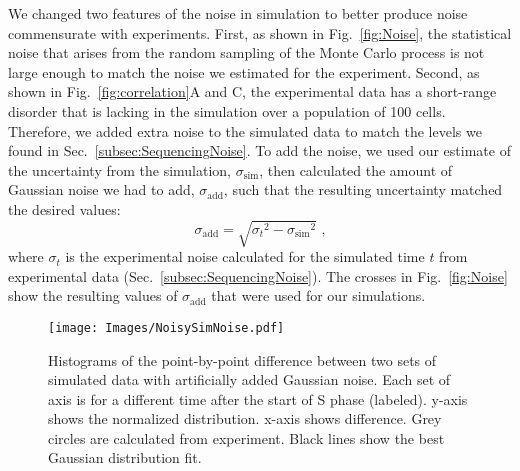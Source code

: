 		We changed two features of the noise in simulation to better produce noise commensurate with experiments.
		First, as shown in Fig.~\ref{fig:Noise}, the statistical noise that arises from the random sampling of the Monte Carlo process is not large enough to match the noise we estimated for the experiment.
		Second, as shown in Fig.~\ref{fig:correlation}A and C, the experimental data has a short-range disorder that is lacking in the simulation over a population of 100 cells.
		Therefore, we added extra noise to the simulated data to match the levels we found in Sec.~\ref{subsec:SequencingNoise}.
		To add the noise, we used our estimate of the uncertainty from the simulation, $\sigma_\text{sim}$, then calculated the amount of Gaussian noise we had to add, $\sigma_\text{add}$, such that the resulting uncertainty matched the desired values:
		\begin{equation} \label{eq:AddingNoise}
			\sigma_\text{add} = \sqrt{{\sigma_t}^2 - {\sigma_\text{sim}}^2} \text{ ,}
		\end{equation}
		where $\sigma_t$ is the experimental noise calculated for the simulated time $t$ from experimental data (Sec.~\ref{subsec:SequencingNoise}).
		The crosses in Fig.~\ref{fig:Noise} show the resulting values of $\sigma_\text{add}$ that were used for our simulations.
		
		\begin{figure}[tbh]
			\begin{center}
				\texttt{[image: Images/NoisySimNoise.pdf]}
			\end{center}
				\caption[Simulation Point-By-Point Difference Distributions With Artificial Noise]{\label{fig:NoisySimNoise} Histograms of the point-by-point difference between two sets of simulated data with artificially added Gaussian noise.
					Each set of axis is for a different time after the start of S phase (labeled).
					y-axis shows the normalized distribution.
					x-axis shows difference.
					Grey circles are calculated from experiment.
					Black lines show the best Gaussian distribution fit.
				}
		\end{figure}
		
